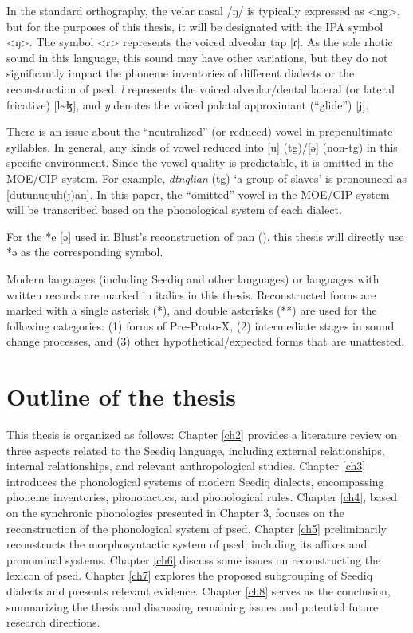 In the standard orthography, the velar nasal /ŋ/ is typically expressed as <ng>, but for the purposes of this thesis, it will be designated with the IPA symbol <ŋ>. The symbol <r> represents the voiced alveolar tap [ɾ]. As the sole rhotic sound in this language, this sound may have other variations, but they do not significantly impact the phoneme inventories of different dialects or the reconstruction of \acl{psed}. \textit{l} represents the voiced alveolar/dental lateral (or lateral fricative) [l\~{ }ɮ], and \textit{y} denotes the voiced palatal approximant (``glide'') [j].

There is an issue about the ``neutralized'' (or reduced) vowel in prepenultimate syllables. In general, any kinds of vowel reduced into [u] (\ac{tg})/[ə] (non-\ac{tg}) in this specific environment. Since the vowel quality is predictable, it is omitted in the MOE/CIP system. For example, \textit{dtnqlian} (\ac{tg}) `a group of slaves' is pronounced as [dutunuquli(j)an]. In this paper, the ``omitted'' vowel in the MOE/CIP system will be transcribed based on the phonological system of each dialect. 

For the *e [ə] used in Blust's reconstruction of \acl{pan} (\cite{ACD}), this thesis will directly use *ə as the corresponding symbol. 

Modern languages (including Seediq and other languages) or languages with written records are marked in italics in this thesis. Reconstructed forms are marked with a single asterisk (*), and double asterisks (**) are used for the following categories: (1) forms of Pre-Proto-X, (2) intermediate stages in sound change processes, and (3) other hypothetical/expected forms that are unattested.

\section{Outline of the thesis}

This thesis is organized as follows: Chapter \ref{ch2} provides a literature review on three aspects related to the Seediq language, including external relationships, internal relationships, and relevant anthropological studies. Chapter \ref{ch3} introduces the phonological systems of modern Seediq dialects, encompassing phoneme inventories, phonotactics, and phonological rules. Chapter \ref{ch4}, based on the synchronic phonologies presented in Chapter 3, focuses on the reconstruction of the phonological system of \acl{psed}. Chapter \ref{ch5} preliminarily reconstructs the morphosyntactic system of \acl{psed}, including its affixes and pronominal systems. Chapter \ref{ch6} discuss some issues on reconstructing the lexicon of \acl{psed}. Chapter \ref{ch7} explores the proposed subgrouping of Seediq dialects and presents relevant evidence. Chapter \ref{ch8} serves as the conclusion, summarizing the thesis and discussing remaining issues and potential future research directions.